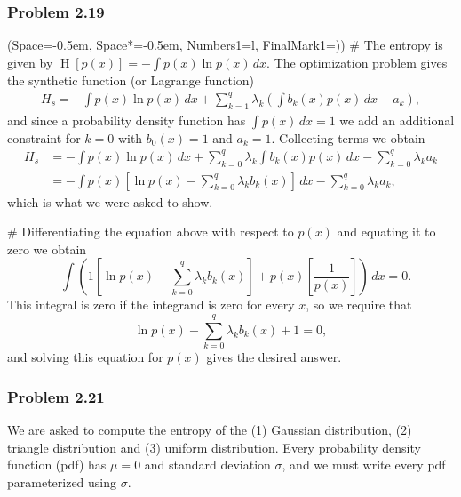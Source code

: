 \documentclass[12pt, a4paper]{article}
\newcommand{\listSpace}{-0.5em}%
\renewcommand{\H}{\operatorname{H}}
\begin{document}
\subsubsection*{Problem 2.19}
\begin{easylist}[enumerate]
\ListProperties(Space=\listSpace, Space*=\listSpace, Numbers1=l, FinalMark1={)})
# The entropy is given by $\H\left[p(x)\right] = - \int p(x) \ln p(x) \, dx$.
The optimization problem gives the synthetic function (or Lagrange function)
\begin{align*}
	H_s = - \int p(x) \ln p(x) \, dx + \sum_{k=1} ^{q} \lambda_k \left( \int b_k(x) p(x) \, dx - a_k \right),
\end{align*}
and since a probability density function has $\int p(x) \, dx = 1$ we add an additional constraint for $k=0$ with $b_0(x) = 1$ and $a_k = 1$.
Collecting terms we obtain
\begin{align*}
H_s &= - \int p(x) \ln p(x) \, dx + \sum_{k=0} ^{q} \lambda_k  \int b_k(x) p(x) \, dx - \sum_{k=0} ^{q} \lambda_k a_k  \\
&= - \int p(x) 
\left[ \ln p(x) - \sum_{k=0} ^{q} \lambda_k b_k(x) \right] \, dx - \sum_{k=0} ^{q} \lambda_k a_k ,
\end{align*}
which is what we were asked to show.

# Differentiating the equation above with respect to $p(x)$ and equating it to zero we obtain
\begin{equation*}
	- \int \left(  1 \left[ \ln p(x) - \sum_{k=0} ^{q} \lambda_k b_k(x) \right] + p(x) \left[ \frac{1}{p(x)} \right] \right) \, dx = 0.
\end{equation*}
This integral is zero if the integrand is zero for every $x$, so we require that
\begin{equation*}
	 \ln p(x) - \sum_{k=0} ^{q} \lambda_k b_k(x) + 1 = 0,
\end{equation*}
and solving this equation for $p(x)$ gives the desired answer.
\end{easylist}

\subsubsection*{Problem 2.21}
We are asked to compute the entropy of the (1) Gaussian distribution, (2) triangle distribution and (3) uniform distribution. 
Every probability density function (pdf) has $\mu = 0$ and standard deviation $\sigma$, and we must write every pdf parameterized using $\sigma$.
\end{document}
